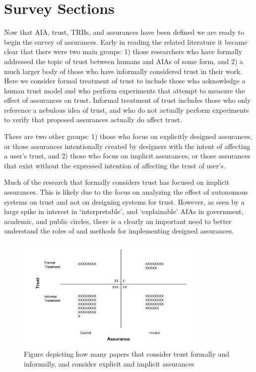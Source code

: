 

\section{Survey Sections} \label{sec:survey}
Now that AIA, trust, TRBs, and assurances have been defined we are ready to begin the survey of assurances. Early in reading the related literature it became clear that there were two main groups: 1) those researchers who have formally addressed the topic of trust between humans and AIAs of some form, and 2) a much larger body of those who have informally considered trust in their work. Here we consider formal treatment of trust to include those who acknowledge a human trust model and who perform experiments that attempt to measure the effect of assurances on trust. Informal treatment of trust includes those who only reference a nebulous idea of trust, and who do not actually perform experiments to verify that proposed assurances actually do affect trust. 

There are two other  groups: 1) those who focus on explicitly designed assurances, or those assurances intentionally created by designers with the intent of affecting a user's trust, and 2) those who focus on implicit assurances, or those assurances that exist without the expressed intention of affecting the trust of user's.

Much of the research that formally considers trust has focused on implicit assurances. This is likely due to the focus on analyzing the effect of autonomous systems on trust and not on designing systems for trust. However, as seen by a large spike in interest in `interpretable', and `explainable' AIAs in government, academic, and public circles, there is a clearly an important need to better understand the roles of and methods for implementing designed assurances. 

\begin{figure}[htbp]
    \centering
    \includegraphics[width=0.8\textwidth]{Figures/Trust_vs_Assurance_Intention.pdf}
    \caption{Figure depicting how many papers that consider trust formally and informally, and consider explicit and implicit assurances}
    \label{fig:trust_assurance_intention}
\end{figure}

